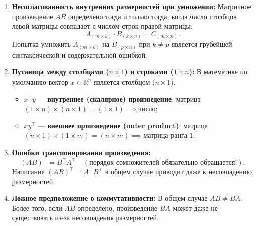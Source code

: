 \begin{enumerate}
    \item \textbf{Несогласованность внутренних размерностей при умножении:} Матричное произведение $A B$
    определено тогда и только тогда, когда число столбцов левой матрицы совпадает с числом строк правой матрицы:
    \[ A_{(m \times k)} \cdot B_{(k \times n)} = C_{(m \times n)}. \]
    Попытка умножить $A_{(m \times k)}$ на $B_{(p \times n)}$ при $k \ne p$ является грубейшей синтаксической и
    содержательной ошибкой.
    \item \textbf{Путаница между столбцами ($n \times 1$) и строками ($1 \times n$):} В математике по умолчанию
    вектор $x \in \mathbb{R}^n$ является столбцом ($n \times 1$).
    \begin{itemize}
        \item $x^\top y$ — \textbf{внутреннее (скалярное) произведение}: матрица
        $(1 \times n) \times (n \times 1) = (1 \times 1) \implies \text{число}$;
        \item $x y^\top$ — \textbf{внешнее произведение (outer product)}: матрица
        $(n \times 1) \times (1 \times m) = (n \times m) \implies \text{матрица ранга 1}$.
    \end{itemize}
    \item \textbf{Ошибки транспонирования произведения:}
    \[ (A B)^\top = B^\top A^\top \quad (\text{порядок сомножителей обязательно обращается!}). \]
    Написание $(AB)^\top = A^\top B^\top$ в общем случае приводит даже к несовпадению размерностей.
    \item \textbf{Ложное предположение о коммутативности:} В общем случае $A B \ne B A$.
    Более того, если $A B$ определено, произведение $B A$ может даже не существовать из-за несовпадения
    размерностей.
\end{enumerate}

\newpage

